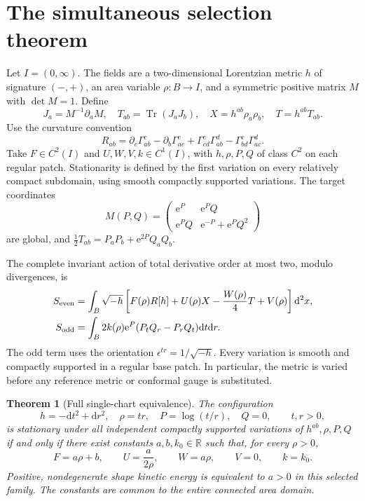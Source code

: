\documentclass[11pt]{article}
\newtheorem{theorem}{Theorem}[section]
\newcommand{\Tr}{\operatorname{Tr}}
\newcommand{\R}{\mathbb R}
\newcommand{\dd}{\mathrm d}
\newcommand{\vol}{\sqrt{-h}}
\newcommand{\e}{\mathrm e}
\begin{document}
\tableofcontents\newpage

\section{The simultaneous selection theorem}

Let $I=(0,\infty)$. The fields are a two-dimensional Lorentzian metric $h$ of signature $(-,+)$, an area variable $\rho:B\to I$, and a symmetric positive matrix $M$ with $\det M=1$. Define
\begin{equation}
 J_a=M^{-1}\partial_aM,\quad T_{ab}=\Tr(J_aJ_b),\quad
 X=h^{ab}\rho_a\rho_b,\quad T=h^{ab}T_{ab}.
\end{equation}
Use the curvature convention
\begin{equation}
 R_{ab}=\partial_c\Gamma^c_{ab}-\partial_b\Gamma^c_{ac}
 +\Gamma^c_{cd}\Gamma^d_{ab}-\Gamma^c_{bd}\Gamma^d_{ac}.
\end{equation}
Take $F\in C^2(I)$ and $U,W,V,k\in C^1(I)$, with $h,\rho,P,Q$ of class $C^2$ on each regular patch. Stationarity is defined by the first variation on every relatively compact subdomain, using smooth compactly supported variations. The target coordinates
\begin{equation}\label{eq:M}
 M(P,Q)=\begin{pmatrix}\e^P&\e^PQ\\\e^PQ&\e^{-P}+\e^PQ^2\end{pmatrix}
\end{equation}
are global, and $\tfrac12T_{ab}=P_aP_b+\e^{2P}Q_aQ_b$.

The complete invariant action of total derivative order at most two, modulo divergences, is
\begin{align}
 S_{\rm even}&=\int_B\vol\left[F(\rho)R[h]+U(\rho)X-\frac{W(\rho)}4T+V(\rho)\right]\dd^2x,\label{eq:action}\\
 S_{\rm odd}&=\int_B2k(\rho)\e^P(P_tQ_r-P_rQ_t)\dd t\dd r.\label{eq:odd}
\end{align}
The odd term uses the orientation $\epsilon^{tr}=1/\vol$. Every variation is smooth and compactly supported in a regular base patch. In particular, the metric is varied before any reference metric or conformal gauge is substituted.

\begin{theorem}[Full single-chart equivalence]\label{thm:main}
The configuration
\begin{equation}\label{eq:chart}
 h=-\dd t^2+\dd r^2,\quad \rho=tr,\quad
 P=\log(t/r),\quad Q=0,\qquad t,r>0,
\end{equation}
is stationary under all independent compactly supported variations of $h^{ab},\rho,P,Q$ if and only if there exist constants $a,b,k_0\in\R$ such that, for every $\rho>0$,
\begin{equation}\label{eq:selected}
 \boxed{F=a\rho+b,\qquad U=\frac{a}{2\rho},\qquad W=a\rho,\qquad V=0,\qquad k=k_0.}
\end{equation}
Positive, nondegenerate shape kinetic energy is equivalent to $a>0$ in this selected family. The constants are common to the entire connected area domain.
\end{theorem}
\end{document}
